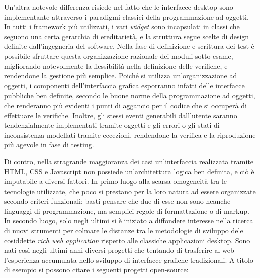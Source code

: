 \documentclass[12pt]{toptesi}
\begin{document}
Un'altra notevole differenza risiede nel fatto che le interfacce desktop sono implementante attraverso i paradigmi classici della programmazione ad oggetti. In tutti i framework più utilizzati, i vari \emph{widget} sono incapsulati in classi che seguono una certa gerarchia di ereditarietà, e la struttura segue scelte di design definite dall'ingegneria del software. Nella fase di definizione e scrittura dei test è possibile sfruttare questa organizzazione razionale dei moduli sotto esame, migliorando notevolmente la flessibilità nella definizione delle verifiche, e rendendone la gestione più semplice. Poiché si utilizza un'organizzazione ad oggetti, i componenti dell'interfaccia grafica esporranno infatti delle interfacce pubbliche ben definite, secondo le buone norme della programmazione ad oggetti, che renderanno più evidenti i punti di aggancio per il codice che si occuperà di effettuare le verifiche. Inoltre, gli stessi eventi generabili dall'utente saranno tendenzialmente implementati tramite oggetti e gli errori o gli stati di inconsistenza modellati tramite eccezioni, rendendone la verifica e la riproduzione più agevole in fase di testing.

Di contro, nella stragrande maggioranza dei casi un'interfaccia realizzata tramite HTML, CSS e Javascript non possiede un'architettura logica ben definita, e ciò è imputabile a diversi fattori. 
In primo luogo alla scarsa omogeneità tra le tecnologie utilizzate, che poco si prestano per la loro natura ad essere organizzate secondo criteri funzionali: basti pensare che due di esse non sono neanche linguaggi di programmazione, ma semplici regole di formattazione o di markup. In secondo luogo, solo negli ultimi si è iniziato a diffondere interesse nella ricerca di nuovi strumenti per colmare le distanze tra le metodologie di sviluppo dele cosiddette \emph{rich web application} rispetto alle classiche applicazioni desktop. Sono nati così negli ultimi anni diversi progetti che tentando di trasferire al web l'esperienza accumulata nello sviluppo di interfacce grafiche tradizionali. A titolo di esempio si possono citare i seguenti progetti open-source:

\end{document}
